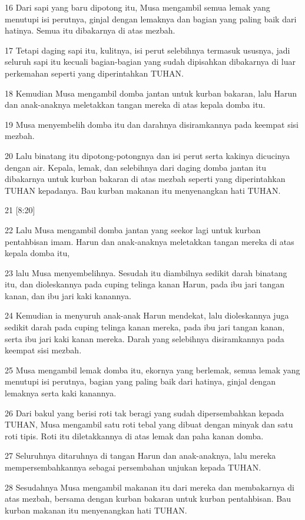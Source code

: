 \par 16 Dari sapi yang baru dipotong itu, Musa mengambil semua lemak yang menutupi isi perutnya, ginjal dengan lemaknya dan bagian yang paling baik dari hatinya. Semua itu dibakarnya di atas mezbah.
\par 17 Tetapi daging sapi itu, kulitnya, isi perut selebihnya termasuk ususnya, jadi seluruh sapi itu kecuali bagian-bagian yang sudah dipisahkan dibakarnya di luar perkemahan seperti yang diperintahkan TUHAN.
\par 18 Kemudian Musa mengambil domba jantan untuk kurban bakaran, lalu Harun dan anak-anaknya meletakkan tangan mereka di atas kepala domba itu.
\par 19 Musa menyembelih domba itu dan darahnya disiramkannya pada keempat sisi mezbah.
\par 20 Lalu binatang itu dipotong-potongnya dan isi perut serta kakinya dicucinya dengan air. Kepala, lemak, dan selebihnya dari daging domba jantan itu dibakarnya untuk kurban bakaran di atas mezbah seperti yang diperintahkan TUHAN kepadanya. Bau kurban makanan itu menyenangkan hati TUHAN.
\par 21 [8:20]
\par 22 Lalu Musa mengambil domba jantan yang seekor lagi untuk kurban pentahbisan imam. Harun dan anak-anaknya meletakkan tangan mereka di atas kepala domba itu,
\par 23 lalu Musa menyembelihnya. Sesudah itu diambilnya sedikit darah binatang itu, dan dioleskannya pada cuping telinga kanan Harun, pada ibu jari tangan kanan, dan ibu jari kaki kanannya.
\par 24 Kemudian ia menyuruh anak-anak Harun mendekat, lalu dioleskannya juga sedikit darah pada cuping telinga kanan mereka, pada ibu jari tangan kanan, serta ibu jari kaki kanan mereka. Darah yang selebihnya disiramkannya pada keempat sisi mezbah.
\par 25 Musa mengambil lemak domba itu, ekornya yang berlemak, semua lemak yang menutupi isi perutnya, bagian yang paling baik dari hatinya, ginjal dengan lemaknya serta kaki kanannya.
\par 26 Dari bakul yang berisi roti tak beragi yang sudah dipersembahkan kepada TUHAN, Musa mengambil satu roti tebal yang dibuat dengan minyak dan satu roti tipis. Roti itu diletakkannya di atas lemak dan paha kanan domba.
\par 27 Seluruhnya ditaruhnya di tangan Harun dan anak-anaknya, lalu mereka mempersembahkannya sebagai persembahan unjukan kepada TUHAN.
\par 28 Sesudahnya Musa mengambil makanan itu dari mereka dan membakarnya di atas mezbah, bersama dengan kurban bakaran untuk kurban pentahbisan. Bau kurban makanan itu menyenangkan hati TUHAN.
